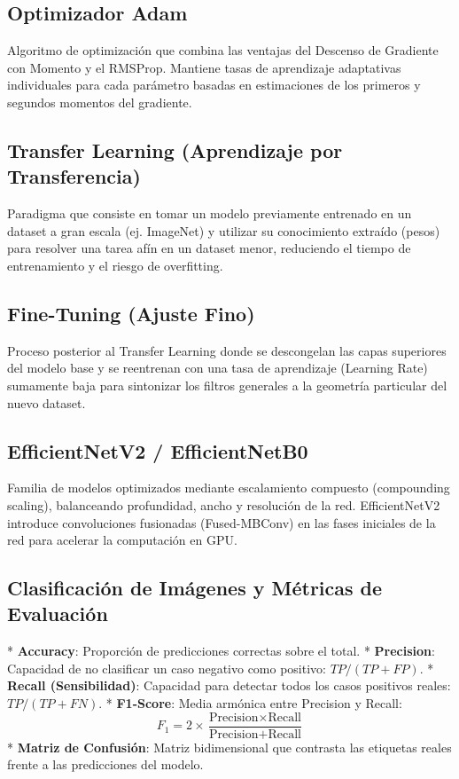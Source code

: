 \documentclass[conference,onecolumn]{IEEEtran}
\begin{document}
\subsection{Optimizador Adam}
Algoritmo de optimización que combina las ventajas del Descenso de Gradiente con Momento y el RMSProp. Mantiene tasas de aprendizaje adaptativas individuales para cada parámetro basadas en estimaciones de los primeros y segundos momentos del gradiente.

\subsection{Transfer Learning (Aprendizaje por Transferencia)}
Paradigma que consiste en tomar un modelo previamente entrenado en un dataset a gran escala (ej. ImageNet) y utilizar su conocimiento extraído (pesos) para resolver una tarea afín en un dataset menor, reduciendo el tiempo de entrenamiento y el riesgo de overfitting.

\subsection{Fine-Tuning (Ajuste Fino)}
Proceso posterior al Transfer Learning donde se descongelan las capas superiores del modelo base y se reentrenan con una tasa de aprendizaje (Learning Rate) sumamente baja para sintonizar los filtros generales a la geometría particular del nuevo dataset.

\subsection{EfficientNetV2 / EfficientNetB0}
Familia de modelos optimizados mediante escalamiento compuesto (compounding scaling), balanceando profundidad, ancho y resolución de la red. EfficientNetV2 introduce convoluciones fusionadas (Fused-MBConv) en las fases iniciales de la red para acelerar la computación en GPU.

\subsection{Clasificación de Imágenes y Métricas de Evaluación}
*   \textbf{Accuracy}: Proporción de predicciones correctas sobre el total.
*   \textbf{Precision}: Capacidad de no clasificar un caso negativo como positivo: $TP / (TP + FP)$.
*   \textbf{Recall (Sensibilidad)}: Capacidad para detectar todos los casos positivos reales: $TP / (TP + FN)$.
*   \textbf{F1-Score}: Media armónica entre Precision y Recall:
    \begin{equation}
        F_1 = 2 \times \frac{\text{Precision} \times \text{Recall}}{\text{Precision} + \text{Recall}}
    \end{equation}
*   \textbf{Matriz de Confusión}: Matriz bidimensional que contrasta las etiquetas reales frente a las predicciones del modelo.
\end{document}
